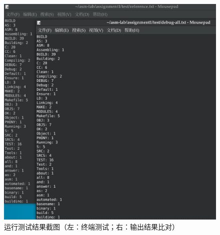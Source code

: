 \documentclass[10pt,a4paper]{article}
\begin{document}
\begin{figure}[H]
\begin{minipage}{0.49\linewidth}
		\centerline{\includegraphics[width=\textwidth]{images/comparison.png}}
	\end{minipage}
 
	\caption{运行测试结果截图（左：终端测试；右：输出结果比对）}
\end{figure}
\end{document}
